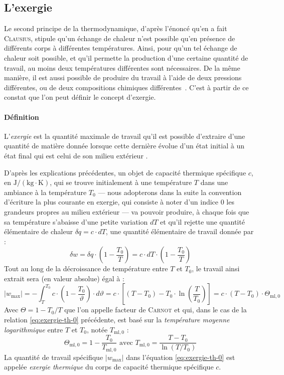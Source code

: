\documentclass[a4paper,11pt]{scrartcl}
\begin{document}
\subsection{L'exergie} Le second principe de la thermodynamique, d'après l'énoncé qu'en a fait \textsc{Clausius}, stipule qu'un échange de chaleur n'est possible qu'en présence de différents corps à différentes températures. Ainsi, pour qu'un tel échange de chaleur soit possible, et qu'il permette la production d'une certaine quantité de travail, au moins deux températures différentes sont nécessaires. De la même manière, il est aussi possible de produire du travail à l'aide de deux pressions différentes, ou de deux compositions chimiques différentes~\cite{Chambadal-1974}. C'est à partir de ce constat que l'on peut définir le concept d'exergie.

\paragraph{Définition} L'\emph{exergie} est la quantité maximale de travail qu'il est possible d'extraire d'une quantité de matière donnée lorsque cette dernière évolue d'un état initial à un état final qui est celui de son milieu extérieur \cite{Chambadal-1974,TI-BE8015}.

\bigskip

D'après les explications précédentes, un objet de capacité thermique spécifique $c$, en $\mathrm{J/(kg \cdot K)}$, qui se trouve initialement à une température $T$ dans une ambiance à la température $T_0$ --- nous adopterons dans la suite la convention d'écriture la plus courante en exergie, qui consiste à noter d'un indice $0$ les grandeurs propres au milieu extérieur --- va pouvoir produire, à chaque fois que sa température s'abaisse d'une petite variation $dT$ et qu'il rejette une quantité élémentaire de chaleur $\delta q = c \cdot dT$, une quantité élémentaire de travail donnée par : \begin{equation}
    \delta w = \delta q \cdot \left( 1 - \frac{T_0}{T} \right) = c \cdot dT \cdot \left( 1 - \frac{T_0}{T} \right)
\end{equation} Tout au long de la décroissance de température entre $T$ et $T_0$, le travail ainsi extrait sera (en valeur absolue) égal à : \begin{equation}
    \vert w_{\max} \vert = -\int_T^{T_0} c \cdot \left( 1 - \frac{T_0}{\vartheta} \right) \cdot d \vartheta = c \cdot \left[ (T - T_0) - T_0 \cdot \ln\left( \frac{T}{T_0} \right) \right] = c \cdot (T-T_0) \cdot \Theta_{\text{ml},0} \label{eq:exergie-th-0}
\end{equation} Avec $\Theta=1-T_0/T$ que l'on appelle facteur de \textsc{Carnot} et qui, dans le cas de la relation \eqref{eq:exergie-th-0} précédente, est basé sur la \emph{température moyenne logarithmique} entre $T$ et $T_0$, notée $T_{\text{ml},0}$ : \begin{equation}
    \Theta_{\text{ml},0} = 1 - \frac{T_0}{T_{\text{ml},0}} \text{ avec } T_{\text{ml},0} = \frac{T-T_0}{\ln(T/T_0)}
\end{equation} La quantité de travail spécifique $\vert w_{\max} \vert$ dans l'équation \eqref{eq:exergie-th-0} est appelée \emph{exergie thermique} du corps de capacité thermique spécifique $c$.
\end{document}
